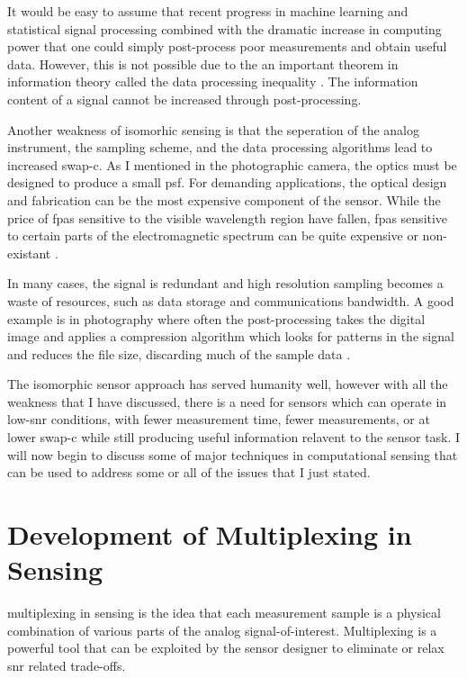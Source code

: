 It would be easy to assume that recent progress in machine learning and statistical signal processing combined with the dramatic increase in computing power that one could simply post-process poor measurements and obtain useful data. However, this is not possible due to the an important theorem in information theory called the \gls{data processing inequality} \cite{cover2012elements}. The information content of a signal cannot be increased through post-processing.


Another weakness of isomorhic sensing is that the seperation of the analog instrument, the sampling scheme, and the data processing algorithms lead to increased \gls{swap-c}. As I mentioned in the photographic camera, the optics must be designed to produce a small \gls{psf}. For demanding applications, the optical design and fabrication can be the most expensive component of the sensor. While the price of \gls{fpa}s sensitive to the visible wavelength region have fallen, \glspl{fpa} sensitive to certain parts of the electromagnetic spectrum can be quite expensive or non-existant \cite{watts2014terahertz, noor2011compressive}.

In many cases, the signal is redundant and high resolution sampling becomes a waste of resources, such as data storage and communications bandwidth. A good example is in photography where often the post-processing takes the digital image and applies a compression algorithm which looks for patterns in the signal and reduces the file size, discarding much of the sample data \cite{taubman2012jpeg2000}. 

The isomorphic sensor approach has served humanity well, however with all the weakness that I have discussed, there is a need for sensors which can operate in low-\gls{snr} conditions, with fewer measurement time, fewer measurements, or at lower \gls{swap-c} while still producing useful information relavent to the sensor task. I will now begin to discuss some of major techniques in computational sensing that can be used to address some or all of the issues that I just stated. 

\section{Development of Multiplexing in Sensing}\label{sec:multiplexInSensing}

\Gls{multiplexing} in sensing is the idea that each measurement sample is a physical combination of various parts of the analog signal-of-interest.  Multiplexing is a powerful tool that can be exploited by the sensor designer to eliminate or relax \gls{snr} related trade-offs. 

